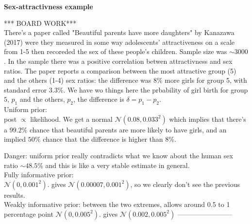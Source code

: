 \documentclass[]{article}
\begin{document}
\textbf{Sex-attractivness example}

*** BOARD WORK*** \\
There's a paper called "Beautiful parents have more daughters" by Kanazawa (2017) were they measured in some way adolescents' attractiveness on a scale from 1-5 then recoreded the sex of these people's children. Sample size was $\sim 3000$. In the sample there was a positive correlation betwen attractivness and sex ratios. The paper reports a comparison between the most attractive group (5) and the others (1-4) sex ratios: the difference was $8\%$ more girls for group 5, with standard error $3.3\%$. We have wo things here the prbability of girl birth for group $5$, $p_1$ and the others, $p_2$, the difference is $\delta = p_1 - p_2$.\\

\noindent Uniform prior:\\ 
post $\propto$ likelihood. We get a normal $\mathcal{N}(0.08, 0.033^2)$ which implies that there's a $99.2\%$ chance that beautiful parents are more likely to have girls, and an implied $50\%$ chance that the difference is higher than $8\%$. 

\noindent Danger: uniform prior really contradicts what we know about the human sex ratio $\sim 48.5\%$ and this is like a very stable estimate in general.\\
\noindent Fully informative prior:\\
$\mathcal{N}(0, 0.001^2)$. gives $\mathcal{N}(0.00007, 0.001^2)$, so we clearly don't see the previous results. \\
\noindent Weakly informative prior: between the two extremes, allows around 0.5 to 1 percentage point
$\mathcal{N}(0, 0.005^2)$. gives $\mathcal{N}(0.002, 0.005^2)$
------------------------\\
\end{document}

